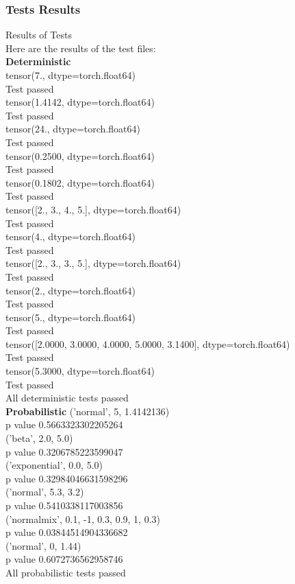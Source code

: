 \documentclass{article}
\def\blu#1{{\color{blu}#1}}
\begin{document}
\subsubsection{Tests Results}
\blu{Results of Tests}\\
Here are the results of the test files:\\
\textbf{Deterministic}\\
tensor(7., dtype=torch.float64)\\
Test passed\\
tensor(1.4142, dtype=torch.float64)\\
Test passed\\
tensor(24., dtype=torch.float64)\\
Test passed\\
tensor(0.2500, dtype=torch.float64)\\
Test passed\\
tensor(0.1802, dtype=torch.float64)\\
Test passed\\
tensor([2., 3., 4., 5.], dtype=torch.float64)\\
Test passed\\
tensor(4., dtype=torch.float64)\\
Test passed\\
tensor([2., 3., 3., 5.], dtype=torch.float64)\\
Test passed\\
tensor(2., dtype=torch.float64)\\
Test passed\\
tensor(5., dtype=torch.float64)\\
Test passed\\
tensor([2.0000, 3.0000, 4.0000, 5.0000, 3.1400], dtype=torch.float64)\\
Test passed\\
tensor(5.3000, dtype=torch.float64)\\
Test passed\\
All deterministic tests passed\\
\textbf{Probabilistic}
('normal', 5, 1.4142136)\\
p value 0.5663323302205264\\
('beta', 2.0, 5.0)\\
p value 0.3206785223599047\\
('exponential', 0.0, 5.0)\\
p value 0.32984046631598296\\
('normal', 5.3, 3.2)\\
p value 0.5410338117003856\\
('normalmix', 0.1, -1, 0.3, 0.9, 1, 0.3)\\
p value 0.03844514904336682\\
('normal', 0, 1.44)\\
p value 0.6072736562958746\\
All probabilistic tests passed
\end{document}
